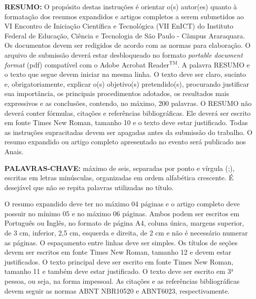 \documentclass[11pt,a4paper]{article}
\begin{document}
\noindent
{\fontsize{10}{10}\selectfont
\textbf{RESUMO:} O propósito destas instruções é orientar o(s) autor(es) quanto à formatação dos resumos expandidos e artigos completos a serem submetidos ao VI Encontro de Iniciação Científica e Tecnológica (VII EnICT) do Instituto Federal de Educação, Ciência e Tecnologia de São Paulo - Câmpus Araraquara. Os documentos devem ser redigidos de acordo com as normas para elaboração. O arquivo de submissão deverá estar desbloqueado no formato \textit{portable document format} (pdf) compatível com o Adobe Acrobat Reader$^{\text{TM}}$. A palavra RESUMO e o texto que segue devem iniciar na mesma linha. O texto deve ser claro, sucinto e, obrigatoriamente, explicar o(s) objetivo(s) pretendido(s), procurando justificar sua importância, os principais procedimentos adotados, os resultados mais expressivos e as conclusões, contendo, no máximo, 200 palavras. O RESUMO não deverá conter fórmulas, citações e referências bibliográficas. Ele deverá ser escrito em fonte Times New Roman, tamanho 10 e o texto deve estar justificado. Todas as instruções supracitadas devem ser apagadas antes da submissão do trabalho. O resumo expandido ou artigo completo apresentado no evento será publicado nos Anais.

\vspace{0.25cm}

\noindent
\textbf{PALAVRAS-CHAVE:} máximo de seis, separadas por ponto e vírgula (;), escritas em letras minúsculas, organizadas em ordem alfabética crescente. É desejável que não se repita palavras utilizadas no título.}


\vspace{0.5cm}

O resumo expandido deve ter no máximo 04 páginas e o artigo completo deve possuir no mínimo 05 e no máximo 06 páginas. Ambos podem ser escritos em Português ou Inglês, no formato de página A4, coluna única, margens superior, de 3 cm, inferior, 2,5 cm, esquerda e direita, de 2 cm e não é necessário numerar as páginas. O espaçamento entre linhas deve ser simples. Os títulos de seções devem ser escritos em fonte Times New Roman, tamanho 12 e devem estar justificados. O texto principal deve ser escrito em fonte Times New Roman, tamanho 11 e também deve estar justificado. O texto deve ser escrito em 3$^{\text{a}}$ pessoa, ou seja, na forma impessoal. As citações e as referências bibliográficas devem seguir as normas ABNT NBR10520 e ABNT6023, respectivamente.
\end{document}
